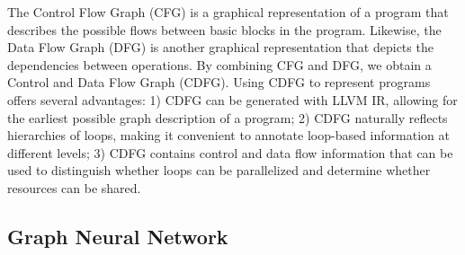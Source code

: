 \documentclass[conference]{IEEEtran}
\begin{document}
The Control Flow Graph (CFG) is a graphical representation of a program that describes the possible flows between basic blocks in the program. Likewise, the Data Flow Graph (DFG) is another graphical representation that depicts the dependencies between operations. By combining CFG and DFG, we obtain a Control and Data Flow Graph (CDFG). 
Using CDFG to represent programs offers several advantages: 1) CDFG can be generated with LLVM IR, allowing for the earliest possible graph description of a program; 2) CDFG naturally reflects hierarchies of loops, making it convenient to annotate loop-based information at different levels; 3) CDFG contains control and data flow information that can be used to distinguish whether loops can be parallelized and determine whether resources can be shared.



\vspace{-0.1cm} 
\subsection{Graph Neural Network}
\vspace{-0.1cm} 

\end{document}
